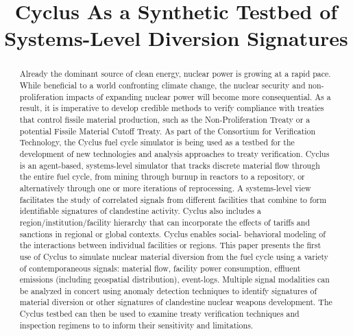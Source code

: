 \documentclass[12pt]{paper}
\begin{document}
\title{Cyclus As a Synthetic Testbed of Systems-Level Diversion Signatures}


\date{}


\maketitle



\begin{abstract}

  Already the dominant source of clean energy, nuclear power is growing at a
  rapid pace.  While beneficial to a world confronting climate change, the
  nuclear security and non-proliferation impacts of expanding nuclear power
  will become more consequential.  As a result, it is imperative to develop
  credible methods to verify compliance with treaties that control fissile
  material production, such as the Non-Proliferation Treaty or a potential
  Fissile Material Cutoff Treaty. As part of the Consortium for Verification
  Technology, the Cyclus fuel cycle simulator is being used as a testbed for the
  development of new technologies and analysis approaches to treaty
  verification. Cyclus is an agent-based, systems-level simulator that tracks
  discrete material flow through the entire fuel cycle, from mining through
  burnup in reactors to a repository, or alternatively through one or more
  iterations of reprocessing. A systems-level view facilitates the study of
  correlated signals from different facilities that combine to form identifiable
  signatures of clandestine activity. Cyclus also includes a
  region/institution/facility hierarchy that can incorporate the effects of
  tariffs and sanctions in regional or global contexts.  Cyclus enables social-
  behavioral modeling of the interactions between individual facilities or
  regions.  This paper presents the first use of Cyclus to simulate nuclear
  material diversion from the fuel cycle using a variety of contemporaneous signals:
  material flow, facility power consumption, effluent emissions (including
  geospatial distribution), event-logs.  Multiple signal modalities can be
  analyzed in concert using anomaly detection techniques to identify signatures
  of material diversion or other signatures of clandestine nuclear weapons
  development.  The Cyclus testbed can then be used to examine treaty
  verification techniques and inspection regimens to to inform their sensitivity
  and limitations.

\end{abstract}










\begin{small}


\end{small}
\end{document}
